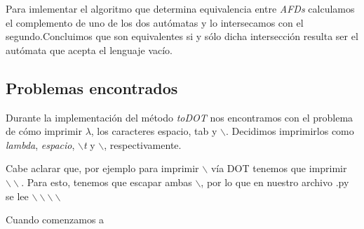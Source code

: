 Para imlementar el algoritmo que determina equivalencia entre \emph{AFDs} calculamos el complemento de uno de los dos autómatas y lo intersecamos con el segundo.Concluimos que son equivalentes si y sólo dicha intersección resulta ser el autómata que acepta el lenguaje vacío.


\subsection{Problemas encontrados}

Durante la implementación del método \emph{toDOT} nos encontramos con el problema de cómo imprimir $\lambda$, los caracteres espacio, tab y $\backslash$. Decidimos imprimirlos como \emph{lambda}, \emph{espacio},  \emph{$\backslash$t} y $\backslash$, respectivamente.

Cabe aclarar que, por ejemplo para imprimir $\backslash$ vía DOT tenemos que imprimir $\backslash\backslash$. Para esto, tenemos que escapar ambas $\backslash$, por lo que en nuestro archivo .py se lee $\backslash\backslash\backslash\backslash$

Cuando comenzamos a 



